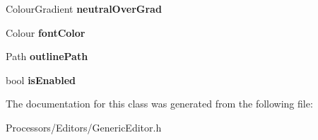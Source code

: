 \begin{DoxyCompactItemize}
\item 
\hypertarget{classUtilityButton_aa808a3cb8673c8148fee1450ce7c4648}{Colour\-Gradient {\bfseries neutral\-Over\-Grad}}\label{classUtilityButton_aa808a3cb8673c8148fee1450ce7c4648}

\item 
\hypertarget{classUtilityButton_ae32c460e56bbeaaa7ab2bcd9081bb35c}{Colour {\bfseries font\-Color}}\label{classUtilityButton_ae32c460e56bbeaaa7ab2bcd9081bb35c}

\item 
\hypertarget{classUtilityButton_a70fe4c7e3ad6f5267bbcc304f324747c}{Path {\bfseries outline\-Path}}\label{classUtilityButton_a70fe4c7e3ad6f5267bbcc304f324747c}

\item 
\hypertarget{classUtilityButton_ae37208d29f863b9405b5990016c13ce3}{bool {\bfseries is\-Enabled}}\label{classUtilityButton_ae37208d29f863b9405b5990016c13ce3}

\end{DoxyCompactItemize}


The documentation for this class was generated from the following file\-:\begin{DoxyCompactItemize}
\item 
Processors/\-Editors/Generic\-Editor.\-h\end{DoxyCompactItemize}
